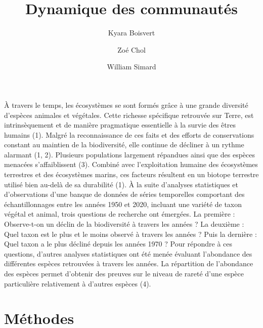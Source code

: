 \documentclass[9pt,twocolumn,twoside,]{pnas-new}
\title{Dynamique des communautés}
\author[a]{Kyara Boisvert}
\author[a]{Zoé Chol}
\author[a]{William Simard}
\affil[a]{Université de Sherbrooke, Département d'écologie, 2500
Boulevard de l'Université, Sherbrooke, Québec, J1N 3C6}
\begin{document}
\verticaladjustment{-2pt}



\maketitle
\thispagestyle{firststyle}


\acknow{}

À travers le temps, les écosystèmes se sont formés grâce à une grande
diversité d'espèces animales et végétales. Cette richesse spécifique
retrouvée sur Terre, est intrinsèquement et de manière pragmatique
essentielle à la survie des êtres humains (1). Malgré la reconnaissance
de ces faits et des efforts de conservations constant au maintien de la
biodiversité, elle continue de décliner à un rythme alarmant (1, 2).
Plusieurs populations largement répandues ainsi que des espèces menacées
s'affaiblissent (3). Combiné avec l'exploitation humaine des écosystèmes
terrestres et des écosystèmes marins, ces facteurs résultent en un
biotope terrestre utilisé bien au-delà de sa durabilité (1). À la suite
d'analyses statistiques et d'observations d'une banque de données de
séries temporelles comportant des échantillonnages entre les années 1950
et 2020, incluant une variété de taxon végétal et animal, trois
questions de recherche ont émergées. La première : Observe-t-on un
déclin de la biodiversité à travers les années ? La deuxième : Quel
taxon est le plus et le moins observé à travers les années ? Puis la
dernière : Quel taxon a le plus décliné depuis les années 1970 ? Pour
répondre à ces questions, d'autres analyses statistiques ont été menée
évaluant l'abondance des différentes espèces retrouvées à travers les
années. La répartition de l'abondance des espèces permet d'obtenir des
preuves sur le niveau de rareté d'une espèce particulière relativement à
d'autres espèces (4).

\section{Méthodes}\label{muxe9thodes}
\end{document}
